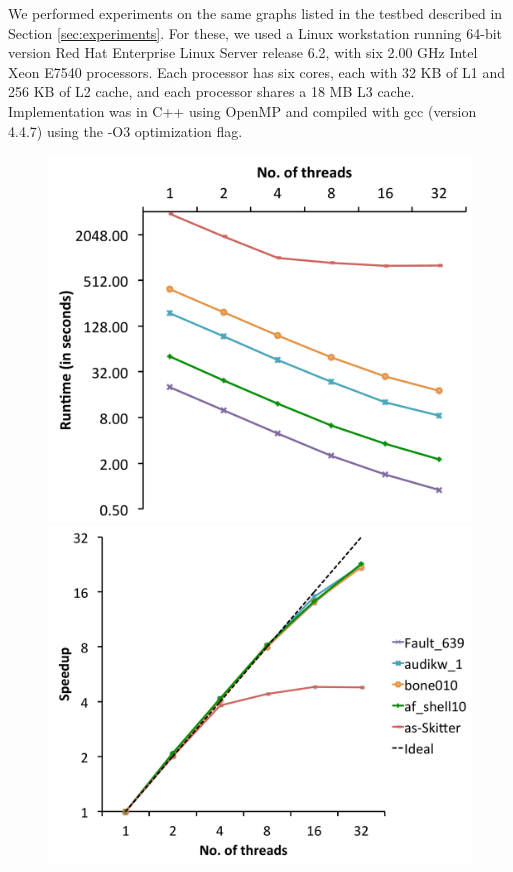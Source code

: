 We performed experiments on the same graphs listed in the testbed described in Section \ref{sec:experiments}. For these, we used a Linux workstation running 64-bit version Red Hat Enterprise Linux Server release 6.2, with six 2.00 GHz Intel Xeon E7540 processors. Each processor has six cores, each with 32 KB of L1 and 256 KB of L2 cache, and each processor shares a 18 MB L3 cache.  Implementation was in C++ using OpenMP and compiled with gcc (version 4.4.7) using the -O3 optimization flag.


\begin{figure}
  \centering
    \includegraphics[scale=0.17]{parallel_realworld_timing.pdf}
    \includegraphics[scale=0.17]{parallel_realworld_speedup.pdf}

\end{figure}
